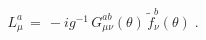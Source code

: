\begin{equation}\label{eq:loft}
L_\mu^a \,=\, -i g^{-1} \, G_{\mu\nu}^{ab}(\theta)\, {\tilde f}_\nu^b (\theta)\;.
\end{equation}

